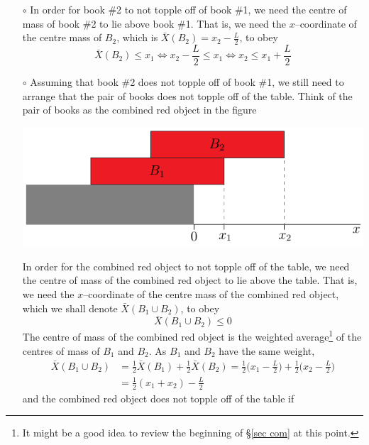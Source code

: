 \begin{itemize}
\begin{itemize}\itemsep1pt \parskip0pt  \itemindent-10pt
\item[$\circ$]
In order for book \#2 to not topple off of book \#1, we need the
centre of mass of book \#2 to lie above book \#1. That is, we need
the $x$--coordinate of the centre mass of $B_2$, which is
$\bar X(B_2)=x_2-\frac{L}{2}$, to obey
\begin{equation*}
\bar X(B_2) \le x_1
\iff
x_2-\frac{L}{2} \le x_1
\iff
x_2\le x_1+\frac{L}{2}
\end{equation*}
\item[$\circ$]
Assuming that book \#2 does not topple off of book \#1, we still
need to arrange that the pair of books does not topple off of the table.
Think of the pair of books as the combined red object in the figure
\begin{efig}
\begin{center}
     \includegraphics{bookStackV2b.pdf}
\end{center}
\end{efig}
In order for the combined red object to not topple off of the table,
we need the centre of mass of the combined red object to lie above
the table. That is, we need the $x$--coordinate
of the centre mass of the combined red object, which we shall denote
$\bar X(B_1\cup B_2)$, to obey
\begin{equation*}
\bar X(B_1\cup B_2) \le 0
\end{equation*}
The centre of mass of the combined red object is the weighted
average\footnote{It might be a good idea to review the beginning of
\S\ref{sec com} at this point.} of the centres of mass of $B_1$ and $B_2$.
As $B_1$ and $B_2$ have the same weight,
\begin{align*}
\bar X(B_1\cup B_2) &= \frac{1}{2}\bar X(B_1) +\frac{1}{2}\bar X(B_2)
    = \frac{1}{2}\Big(x_1-\frac{L}{2}\Big) +\frac{1}{2}\Big(x_2-\frac{L}{2}\Big)
\\
&= \frac{1}{2}(x_1+x_2) -\frac{L}{2}
\end{align*}
and the combined red object does not topple off of the table if

\end{itemize}
\end{itemize}
